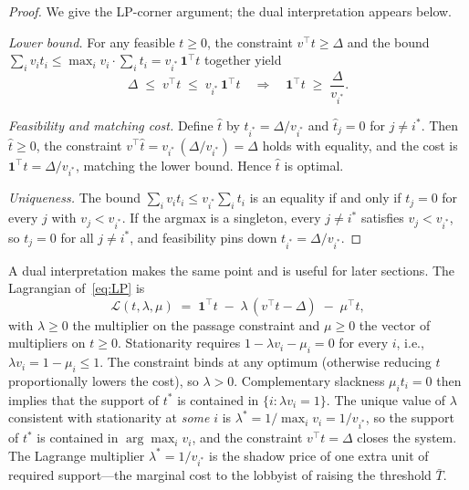 \documentclass[11pt,letterpaper]{article}
\theoremstyle{plain}
\theoremstyle{definition}
\theoremstyle{remark}
\begin{document}
\begin{proof}
We give the LP-corner argument; the dual interpretation appears below.

\emph{Lower bound.} For any feasible $t \geq 0$, the constraint $v^\top t \geq \Delta$ and the bound $\sum_i v_i t_i \leq \max_i v_i \cdot \sum_i t_i = v_{i^*}\, \mathbf{1}^\top t$ together yield
\[
\Delta \;\leq\; v^\top t \;\leq\; v_{i^*}\, \mathbf{1}^\top t \quad\Longrightarrow\quad \mathbf{1}^\top t \;\geq\; \frac{\Delta}{v_{i^*}}.
\]

\emph{Feasibility and matching cost.} Define $\hat t$ by $\hat t_{i^*} = \Delta / v_{i^*}$ and $\hat t_j = 0$ for $j \neq i^*$. Then $\hat t \geq 0$, the constraint $v^\top \hat t = v_{i^*}\,(\Delta/v_{i^*}) = \Delta$ holds with equality, and the cost is $\mathbf{1}^\top \hat t = \Delta / v_{i^*}$, matching the lower bound. Hence $\hat t$ is optimal.

\emph{Uniqueness.} The bound $\sum_i v_i t_i \leq v_{i^*} \sum_i t_i$ is an equality if and only if $t_j = 0$ for every $j$ with $v_j < v_{i^*}$. If the argmax is a singleton, every $j \neq i^*$ satisfies $v_j < v_{i^*}$, so $t_j = 0$ for all $j \neq i^*$, and feasibility pins down $t_{i^*} = \Delta / v_{i^*}$.
\end{proof}

A dual interpretation makes the same point and is useful for later sections. The Lagrangian of~\eqref{eq:LP} is
\[
\mathcal{L}(t, \lambda, \mu) \;=\; \mathbf{1}^\top t \;-\; \lambda\,(v^\top t - \Delta) \;-\; \mu^\top t,
\]
with $\lambda \geq 0$ the multiplier on the passage constraint and $\mu \geq 0$ the vector of multipliers on $t \geq 0$. Stationarity requires $1 - \lambda v_i - \mu_i = 0$ for every $i$, i.e., $\lambda v_i = 1 - \mu_i \leq 1$. The constraint binds at any optimum (otherwise reducing $t$ proportionally lowers the cost), so $\lambda > 0$. Complementary slackness $\mu_i t_i = 0$ then implies that the support of $t^*$ is contained in $\{i : \lambda v_i = 1\}$. The unique value of $\lambda$ consistent with stationarity at \emph{some} $i$ is $\lambda^* = 1 / \max_i v_i = 1/v_{i^*}$, so the support of $t^*$ is contained in $\arg\max_i v_i$, and the constraint $v^\top t = \Delta$ closes the system. The Lagrange multiplier $\lambda^* = 1 / v_{i^*}$ is the shadow price of one extra unit of required support---the marginal cost to the lobbyist of raising the threshold $\bar T$.
\end{document}
